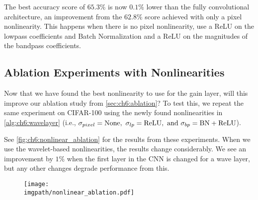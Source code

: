 The best accuracy score of $65.3\%$ is now $0.1\%$ lower than the fully
convolutional architecture, an improvement from the $62.8\%$ score achieved with
only a pixel nonlinearity. This happens when there is no pixel nonlinearity, use
a ReLU on the lowpass coefficients and Batch Normalization and a ReLU on the
magnitudes of the bandpass coefficients.

\subsection{Ablation Experiments with Nonlinearities}
Now that we have found the best nonlinearity to use for the gain layer,
will this improve our ablation study from \autoref{sec:ch6:ablation}? To test this, 
we repeat the same experiment on CIFAR-100 using the newly found nonlinearities
in \autoref{alg:ch6:wavelayer} (i.e., $\sigma_{pixel} = \mathrm{None},\ \sigma_{lp} =
\mathrm{ReLU},\ \text{and } \sigma_{bp} = \mathrm{BN+ReLU}$).

See \autoref{fig:ch6:nonlinear_ablation} for the results from these experiments.
When we use the wavelet-based nonlinearities, the results change considerably. 
We see an improvement by $1\%$ when the first layer in the CNN is
changed for a wave layer, but any other changes degrade performance from this.

\begin{figure}[tb]
  \centering
  \texttt{[image: \\imgpath/nonlinear\_ablation.pdf]}
  \label{fig:ch6:nonlinear_ablation}
\end{figure}

